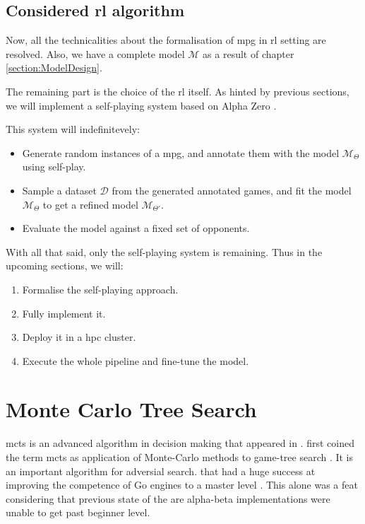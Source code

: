 \subsection{Considered \acrshort{rl} algorithm}
Now, all the technicalities about the formalisation of \acrshort{mpg} in \acrshort{rl} setting are resolved. Also, we have a complete model $\mathcal{M}$ as a result of chapter \ref{section:ModelDesign}.

The remaining part is the choice of the \acrshort{rl} itself. As hinted by previous sections, we will implement a self-playing system based on Alpha Zero \cite{AlphaZero}.

This system will indefinitevely:
\begin{itemize}
	\item Generate random instances of a \acrshort{mpg}, and annotate them with the model $\mathcal{M}_{\Theta}$ using self-play.
	\item Sample a dataset $\mathcal{D}$ from the generated annotated games, and fit the model $\mathcal{M}_{\Theta}$ to get a refined model $\mathcal{M}_{\Theta'}.$
	\item Evaluate the model against a fixed set of opponents.
\end{itemize}
With all that said, only the self-playing system is remaining. Thus in the upcoming sections, we will:
\begin{enumerate}
	\item Formalise the self-playing approach.
	\item Fully implement it.
	\item Deploy it in a \acrshort{hpc} cluster.
	\item Execute the whole pipeline and fine-tune the model.
\end{enumerate}
\newpage
\section{Monte Carlo Tree Search}
\acrfull{mcts} is an advanced algorithm in decision making that appeared in . \citeauthor{MCTSOriginal} first coined the term \acrshort{mcts} as application of Monte-Carlo methods to game-tree search \cite{MCTSOriginal}. It is an important algorithm for adversial search. that had a huge success at improving the competence of Go engines to a master level \cite{GoMaster}. This alone was a feat considering that previous state of the are alpha-beta implementations were unable to get past beginner level. 

